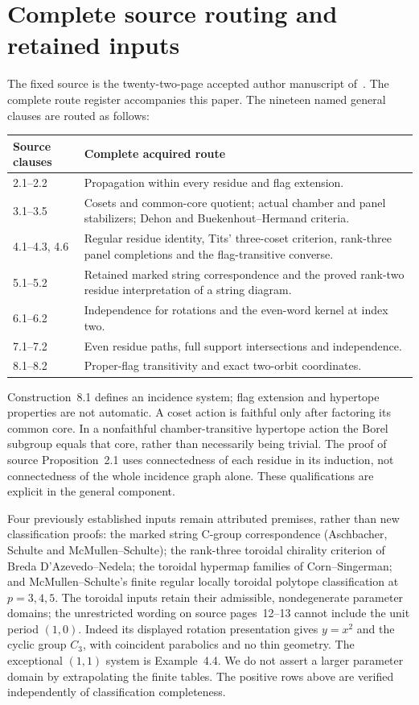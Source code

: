 \documentclass[11pt,a4paper]{article}
\begin{document}
\section{Complete source routing and retained inputs}
The fixed source is the twenty-two-page accepted author manuscript
of~\cite{source}. The complete route register accompanies this paper.
The nineteen named general clauses are routed as follows:
\begin{center}\small
\begin{tabular}{p{}p{}}\toprule
Source clauses&Complete acquired route\\\midrule
2.1--2.2&Propagation within every residue and flag extension.\\
3.1--3.5&Cosets and common-core quotient; actual chamber and panel stabilizers;
Dehon and Buekenhout--Hermand criteria.\\
4.1--4.3, 4.6&Regular residue identity, Tits' three-coset criterion,
rank-three panel completions and the flag-transitive converse.\\
5.1--5.2&Retained marked string correspondence and the proved rank-two
residue interpretation of a string diagram.\\
6.1--6.2&Independence for rotations and the even-word kernel at index two.\\
7.1--7.2&Even residue paths, full support intersections and independence.\\
8.1--8.2&Proper-flag transitivity and exact two-orbit coordinates.\\\bottomrule
\end{tabular}
\end{center}
Construction~8.1 defines an incidence system; flag extension and hypertope
properties are not automatic. A coset action is faithful only after factoring
its common core. In a nonfaithful chamber-transitive hypertope action the
Borel subgroup equals that core, rather than necessarily being trivial.
The proof of source Proposition~2.1 uses connectedness of each residue in
its induction, not connectedness of the whole incidence graph alone.
These qualifications are explicit in the general component.

Four previously established inputs remain attributed premises, rather than
new classification proofs: the marked string C-group correspondence
(Aschbacher, Schulte and McMullen--Schulte); the rank-three toroidal chirality
criterion of Breda D'Azevedo--Nedela; the toroidal hypermap families of
Corn--Singerman; and McMullen--Schulte's finite regular locally toroidal
polytope classification at $p=3,4,5$.
The toroidal inputs retain their admissible, nondegenerate parameter domains;
the unrestricted wording on source pages~12--13 cannot include the unit
period $(1,0)$. Indeed its displayed rotation presentation gives $y=x^2$
and the cyclic group $C_3$, with coincident parabolics and no thin geometry.
The exceptional $(1,1)$ system is Example~4.4. We do not assert a larger
parameter domain by extrapolating the finite tables. The positive rows above
are verified independently of classification completeness.
\end{document}
